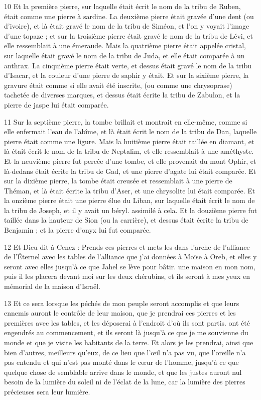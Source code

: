 \par 10 Et la première pierre, sur laquelle était écrit le nom de la tribu de Ruben, était comme une pierre à sardine. La deuxième pierre était gravée d'une dent (ou d'ivoire), et là était gravé le nom de la tribu de Siméon, et l'on y voyait l'image d'une topaze ; et sur la troisième pierre était gravé le nom de la tribu de Lévi, et elle ressemblait à une émeraude. Mais la quatrième pierre était appelée cristal, sur laquelle était gravé le nom de la tribu de Juda, et elle était comparée à un anthrax. La cinquième pierre était verte, et dessus était gravé le nom de la tribu d'Isacar, et la couleur d'une pierre de saphir y était. Et sur la sixième pierre, la gravure était comme si elle avait été inscrite, (ou comme une chrysoprase) tachetée de diverses marques, et dessus était écrite la tribu de Zabulon, et la pierre de jaspe lui était comparée.

\par 11 Sur la septième pierre, la tombe brillait et montrait en elle-même, comme si elle enfermait l'eau de l'abîme, et là était écrit le nom de la tribu de Dan, laquelle pierre était comme une ligure. Mais la huitième pierre était taillée en diamant, et là était écrit le nom de la tribu de Neptalim, et elle ressemblait à une améthyste. Et la neuvième pierre fut percée d'une tombe, et elle provenait du mont Ophir, et là-dedans était écrite la tribu de Gad, et une pierre d'agate lui était comparée. Et sur la dixième pierre, la tombe était creusée et ressemblait à une pierre de Théman, et là était écrite la tribu d'Aser, et une chrysolite lui était comparée. Et la onzième pierre était une pierre élue du Liban, sur laquelle était écrit le nom de la tribu de Joseph, et il y avait un béryl. assimilé à cela. Et la douzième pierre fut taillée dans la hauteur de Sion (ou la carrière), et dessus était écrite la tribu de Benjamin ; et la pierre d'onyx lui fut comparée.

\par 12 Et Dieu dit à Cenez : Prends ces pierres et mets-les dans l'arche de l'alliance de l'Éternel avec les tables de l'alliance que j'ai données à Moïse à Oreb, et elles y seront avec elles jusqu'à ce que Jahel se lève pour bâtir. une maison en mon nom, puis il les placera devant moi sur les deux chérubins, et ils seront à mes yeux en mémorial de la maison d'Israël.

\par 13 Et ce sera lorsque les péchés de mon peuple seront accomplis et que leurs ennemis auront le contrôle de leur maison, que je prendrai ces pierres et les premières avec les tables, et les déposerai à l'endroit d'où ils sont partis. ont été engendrés au commencement, et ils seront là jusqu'à ce que je me souvienne du monde et que je visite les habitants de la terre. Et alors je les prendrai, ainsi que bien d'autres, meilleurs qu'eux, de ce lieu que l'œil n'a pas vu, que l'oreille n'a pas entendu et qui n'est pas monté dans le cœur de l'homme, jusqu'à ce que quelque chose de semblable arrive dans le monde, et que les justes auront nul besoin de la lumière du soleil ni de l’éclat de la lune, car la lumière des pierres précieuses sera leur lumière.

